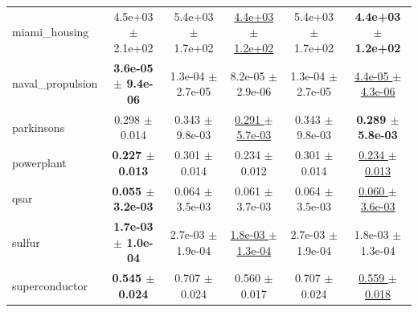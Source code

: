 \begin{table}[!htbp]
{\begin{tabular}{lccccc}
miami\_housing & 4.5e+03 $\pm$ 2.1e+02 & 5.4e+03 $\pm$ 1.7e+02 & \underline{4.4e+03 $\pm$ 1.2e+02} & 5.4e+03 $\pm$ 1.7e+02 & \textbf{4.4e+03 $\pm$ 1.2e+02} \\
naval\_propulsion & \textbf{3.6e-05 $\pm$ 9.4e-06} & 1.3e-04 $\pm$ 2.7e-05 & 8.2e-05 $\pm$ 2.9e-06 & 1.3e-04 $\pm$ 2.7e-05 & \underline{4.4e-05 $\pm$ 4.3e-06} \\
parkinsons & 0.298 $\pm$ 0.014 & 0.343 $\pm$ 9.8e-03 & \underline{0.291 $\pm$ 5.7e-03} & 0.343 $\pm$ 9.8e-03 & \textbf{0.289 $\pm$ 5.8e-03} \\
powerplant & \textbf{0.227 $\pm$ 0.013} & 0.301 $\pm$ 0.014 & 0.234 $\pm$ 0.012 & 0.301 $\pm$ 0.014 & \underline{0.234 $\pm$ 0.013} \\
qsar & \textbf{0.055 $\pm$ 3.2e-03} & 0.064 $\pm$ 3.5e-03 & 0.061 $\pm$ 3.7e-03 & 0.064 $\pm$ 3.5e-03 & \underline{0.060 $\pm$ 3.6e-03} \\
sulfur & \textbf{1.7e-03 $\pm$ 1.0e-04} & 2.7e-03 $\pm$ 1.9e-04 & \underline{1.8e-03 $\pm$ 1.3e-04} & 2.7e-03 $\pm$ 1.9e-04 & 1.8e-03 $\pm$ 1.3e-04 \\
superconductor & \textbf{0.545 $\pm$ 0.024} & 0.707 $\pm$ 0.024 & 0.560 $\pm$ 0.017 & 0.707 $\pm$ 0.024 & \underline{0.559 $\pm$ 0.018} \\
\bottomrule
\end{tabular}
}
\end{table}